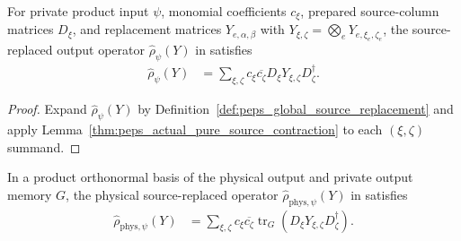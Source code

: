 \begin{lemma}
    \label{thm:peps_actual_pure_source_replacement}
    \leanok
    For private product input $\psi$, monomial coefficients $c_\xi$, prepared
    source-column matrices $D_\xi$, and replacement matrices $Y_{e,\alpha,\beta}$
    with $Y_{\xi,\zeta}=\bigotimes_e Y_{e,\xi_e,\zeta_e}$, the source-replaced
    output operator $\widehat\rho_\psi(Y)$ in
    \cite[proof of Theorem~5.2]{OpenAI2026PolynomialPEPS} satisfies
    \begin{align}
        \widehat\rho_\psi(Y)
         & =\sum_{\xi,\zeta}c_\xi\overline{c_\zeta}
        D_\xi Y_{\xi,\zeta}D_\zeta^\dagger.
        \label{eq:peps_actual_pure_replacement}
    \end{align}
\end{lemma}

\begin{proof}\leanok
    Expand $\widehat\rho_\psi(Y)$ by Definition~\ref{def:peps_global_source_replacement}
    and apply Lemma~\ref{thm:peps_actual_pure_source_contraction} to each
    $(\xi,\zeta)$ summand.
\end{proof}


\begin{lemma}
    \label{thm:peps_actual_pure_physical_source_replacement}
    \leanok
    In a product orthonormal basis of the physical output and private output
    memory $G$, the physical source-replaced operator
    $\widehat\rho_{\mathrm{phys},\psi}(Y)$ in
    \cite[proof of Theorem~5.2]{OpenAI2026PolynomialPEPS} satisfies
    \begin{align}
        \widehat\rho_{\mathrm{phys},\psi}(Y)
         & =\sum_{\xi,\zeta}c_\xi\overline{c_\zeta}
        \operatorname{tr}_{G}(D_\xi Y_{\xi,\zeta}D_\zeta^\dagger).
        \label{eq:peps_actual_pure_physical_replacement}
    \end{align}
\end{lemma}

